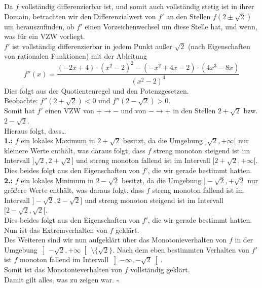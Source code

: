 \documentclass[12pt, a4paper]{article}
\newcommand*{\qed}{\null\nobreak\hfill\ensuremath{\square}}
\begin{document}
Da \(f\) vollständig differenzierbar ist, und somit auch vollständig stetig ist in ihrer Domain, betrachten wir den Differenzialwert von \(f'\) an den Stellen \(f(2 \pm \sqrt{2})\) um herauszufinden, ob \(f'\) einen Vorzeichenwechsel um diese Stelle hat, und wenn, was für ein VZW vorliegt. \\
\(f'\) ist vollständig differenzierbar in jedem Punkt außer \(\sqrt{2}\) (nach Eigenschaften von rationalen Funktionen) mit der Ableitung \[f''(x) = \frac{(-2x+4) \cdot (x^2-2)^2 - (-x^2 + 4x -2) \cdot (4x^3-8x)}{(x^2-2)^4}\]
Dies folgt aus der Quotientenregel und den Potenzgesetzen. \\
Beobachte: \(f''(2 + \sqrt{2}) < 0\) und \(f''(2 - \sqrt{2}) > 0\). \\
Somit hat \(f'\) einen VZW von \(+ \rightarrow -\) und von \(- \rightarrow +\) in den Stellen \(2 + \sqrt{2}\) bzw. \(2 - \sqrt{2}\). \\
Hieraus folgt, dass\dots \pagebreak \\
\textbf{1.:} \(f\) ein lokales Maximum in \(2 + \sqrt{2}\) besitzt, da die Umgebung \(]\sqrt{2}, +\infty[\) nur kleinere Werte enthält, was daraus folgt, dass \(f\) streng monoton steigend ist im Intervall \(]\sqrt{2}, 2+\sqrt{2}]\) und streng monoton fallend ist im Intervall \([2+\sqrt{2}, +\infty[\). \\
Dies beides folgt aus den Eigenschaften von \(f'\), die wir gerade bestimmt hatten. \\
\textbf{2.:} \(f\) ein lokales Minimum in \(2 - \sqrt{2}\) besitzt, da die Umgebung \(]- \sqrt{2}, + \sqrt{2}\) nur größere Werte enthält, was daraus folgt, dass \(f\) streng monoton fallend ist im Intervall \(] - \sqrt{2}, 2 - \sqrt{2}]\) und streng monoton steigend ist im Intervall \([2 - \sqrt{2}, \sqrt{2}[\). \\
Dies beides folgt aus den Eigenschaften von \(f'\), die wir gerade bestimmt hatten. \\
Nun ist das Extremverhalten von \(f\) geklärt.\\
Des Weiteren sind wir nun aufgeklärt über das Monotonieverhalten von \(f\) in der Umgebung \(\left]-\sqrt{2}, +\infty\right[\  \setminus \{\sqrt{2}\}\). Nach dem eben bestimmten Verhalten von \(f'\) ist \(f\) monoton fallend im Intervall \(\left]-\infty, -\sqrt{2}\right[\).\\
Somit ist das Monotonieverhalten von \(f\) vollständig geklärt.\\
Damit gilt alles, was zu zeigen war. \qed \pagebreak
\end{document}
